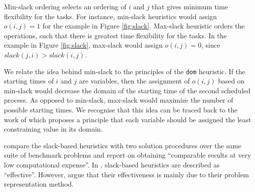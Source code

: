 \documentclass{mprop}
\theoremstyle{definition}
\begin{document}
Min-slack ordering selects an ordering of $i$ and $j$ that gives minimum time flexibility for the tasks. For instance, min-slack heuristics would assign $o(i,j) = 1$ for the example in Figure \ref{fig:slack}.
Max-slack heuristic orders the operations, such that there is greatest time flexibility for the tasks. In the example in Figure \ref{fig:slack}, max-slack would assign $o(i,j) = 0$, since $slack(j, i) > slack(i, j)$.

We relate the idea behind min-slack to the principles of the \texttt{dom} heuristic. If the starting times of $i$ and $j$ are variables, then the assignment of $o(i,j)$ based on min-slack would decrease the domain of the starting time of the second scheduled process. As opposed to min-slack, max-slack would maximize the number of possible starting times. We recognise that this idea can be traced back to the work of \citet{Geelen92} which proposes a principle that each variable should be assigned the least constraining value in its domain.

\citet{Smith93} compare the slack-based heuristics with two solution procedures over the same suite of benchmark problems and report on obtaining ``comparable results at very low computational expense''. In \citet[p.~105]{cpbible}, slack-based heuristics are described as ``effective''. However, \citet{Crawford94} argue that their effectiveness is mainly due to their problem representation method.



\end{document}
